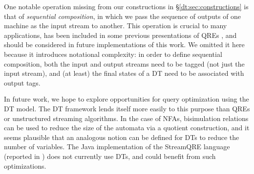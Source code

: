 One notable operation missing from our constructions in \S\ref{dt:sec:constructions} is that of \emph{sequential composition}, in which we pass the sequence of outputs of one machine as the input stream to another. This operation is crucial to many applications, has been included in some previous presentations of QREs \cite{AFR2016QRE, MRAIK2017SQRE},
and should be considered in future implementations of this work. We omitted it here because it introduces notational complexity: in order to define sequential composition, both the input and output streams need to be tagged (not just the input stream), and (at least) the final states of a DT need to be associated with output tags.

In future work, we hope to explore opportunities for query optimization using the DT model. The DT framework lends itself more easily to this purpose than QREs or unstructured streaming algorithms. In the case of NFAs, bisimulation relations can be used to reduce the size of the automata via a quotient construction, and it seems plausible that an analogous notion can be defined for DTs to reduce the number of variables. The Java implementation of the StreamQRE language (reported in \cite{MRAIK2017SQRE}) does not currently use DTs, and could benefit from such optimizations.
